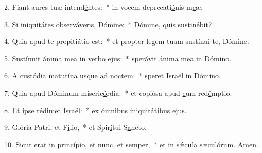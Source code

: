 2. Fiant aures tuæ intend\uline{é}ntes:~* in vocem deprecati\uline{ó}nis m\uline{e}æ.\par 
3. Si iniquitátes observáveris, D\uline{ó}mine:~* Dómine, quis s\uline{u}stin\uline{é}bit?\par 
4. Quia apud te propitiáti\uline{o} est:~* et propter legem tuam sustínu\uline{i} te, D\uline{ó}mine.\par 
5. Sustínuit ánima mea in verbo \uline{e}jus:~* sperávit ánima m\uline{e}a in D\uline{ó}mino.\par 
6. A custódia matutína usque ad n\uline{o}ctem:~* speret Isra\uline{ë}l in D\uline{ó}mino.\par 
7. Quia apud Dóminum miseric\uline{ó}rdia:~* et copiósa apud \uline{e}um red\uline{é}mptio.\par 
8. Et ipse rédimet \uline{I}sraël:~* ex ómnibus iniquit\uline{á}tibus \uline{e}jus.\par 
9. Glória Patri, et F\uline{í}lio,~* et Spir\uline{í}tui S\uline{a}ncto.\par 
10. Sicut erat in princípio, et nunc, et s\uline{e}mper,~* et in sǽcula sæcul\uline{ó}rum. \uline{A}men.\par 
